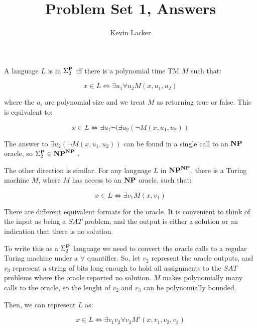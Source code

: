 \documentclass{article}
\newenvironment{problem}[2][Problem]{\begin{trivlist}
\item[\hskip \labelsep {\bfseries #1}\hskip \labelsep {\bfseries #2.}]}{\end{trivlist}}
\begin{document}
\title{Problem Set 1, Answers}
\author{Kevin Lacker}
\maketitle

\begin{problem}{1}

  A language $L$ is in $\Sigma_2^{\bf{P}}$ iff there is a polynomial time TM
  $M$ such that:

  \begin{equation}
    x \in L \iff \exists u_1 \forall u_2 M(x, u_1, u_2)
  \end{equation}

  where the $u_i$ are polynomial size and we treat $M$ as returning
  true or false. This is equivalent to:

  \begin{equation}
    x \in L \iff \exists u_1 \neg ( \exists u_2 ( \neg M(x, u_1, u_2) )
  \end{equation}

  The answer to $\exists u_2 ( \neg M(x, u_1, u_2) )$ can be found
  in a single call to an ${\bf{NP}}$ oracle, so $\Sigma_2^{\bf{P}} \in
  \bf{NP}^{\bf{NP}}$ .

  The other direction is similar. For any language $L$ in
  $\bf{NP}^{\bf{NP}}$, there is a Turing machine $M$, where $M$ has
  access to an ${\bf{NP}}$ oracle, such that:

  \begin{equation}
    x \in L \iff \exists v_1 M(x, v_1)
  \end{equation}

  There are different equivalent formats for the oracle. It is
  convenient to think of the input as being a $SAT$ problem, and the
  output is either a solution or an indication that there is no
  solution.

  To write this as a $\Sigma_2^{\bf{P}}$ language we need to convert
  the oracle calls to a regular Turing machine under a $\forall$
  quantifier. So, let $v_2$ represent the oracle outputs, and $v_3$
  represent a string of
  bits long enough to hold all assignments to the $SAT$ problems where
  the oracle reported no solution. $M$ makes polynomially many calls
  to the oracle, so the lenght of $v_2$ and $v_3$ can be polynomially
  bounded.

  Then, we can represent $L$ as:

  \begin{equation}
    x \in L \iff \exists v_1 v_2 \forall v_3 M'(x, v_1, v_2, v_3)
  \end{equation}


\end{problem}
\end{document}
